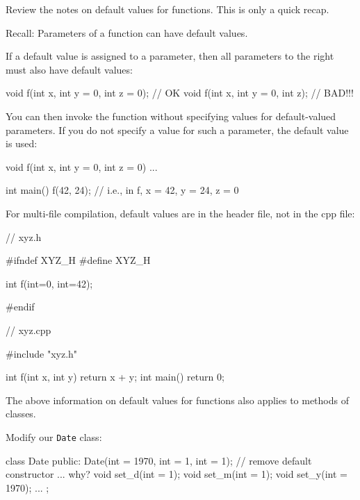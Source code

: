 \newpage{}

Review the notes on default values for functions. This is only a quick
recap.

Recall: Parameters of a function can have default values.

If a default value is assigned to a parameter, then all parameters to
the right must also have default values:

\begin{consolethree}[escapeinside=||]
void f(int x, int y = 0, int z = 0); // OK
void f(int x, int y = 0, int z);     // BAD!!!
\end{consolethree}

You can then invoke the function without specifying values for
default-valued parameters. If you do not specify a value for such a
parameter, the default value is used:

\begin{consolethree}[escapeinside=||]
void f(int x, int y = 0, int z = 0) { ... }

int main()
{
    f(42, 24); // i.e., in f, x = 42, y = 24, z = 0
}
\end{consolethree}

For multi-file compilation, default values are in the header file, not
in the cpp file:

\begin{consolethree}[escapeinside=||]
// xyz.h

#ifndef XYZ_H
#define XYZ_H

int f(int=0, int=42);

#endif
\end{consolethree}

\begin{consolethree}[escapeinside=||]
// xyz.cpp

#include "xyz.h"

int f(int x, int y)
{
    return x + y;
}
int main()
{
    return 0;
}
\end{consolethree}




\newpage{}

The above information on default values for functions also applies to
methods of classes.

Modify our \texttt{Date} class:

\begin{consolethree}[escapeinside=||]
class Date
{
public:
    Date(int = 1970, int = 1, int = 1);
    // remove default constructor ... why?
    void set_d(int = 1);
    void set_m(int = 1);
    void set_y(int = 1970);
    ...
};
\end{consolethree}

